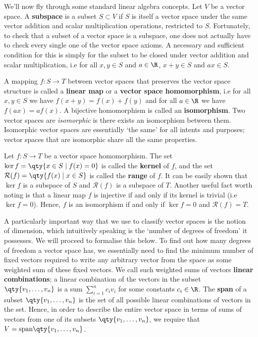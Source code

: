 \vspace{3mm}

We'll now fly through some standard linear algebra concepts. Let \( V \) be a vector space. A \textbf{subspace} is a subset \( S\subset V \) if \( S \) is itself a vector space under the same vector addition and scalar multiplication operations, restricted to \( S \). Fortunately, to check that a subset of a vector space is a subspace, one does not actually have to check every single one of the vector space axioms. A necessary and sufficient condition for this is simply for the subset to be closed under vector addition and scalar multiplication, i.e for all \( x,y\in S \) and \( a\in\R \), \( x+y\in S \) and \( ax\in S \).

\vspace{3mm}

A mapping \( f:S\to T \) between vector spaces that preserves the vector space structure is called a \textbf{linear map} or a \textbf{vector space homomorphism}, i.e for all \( x,y\in S \) we have \( f(x+y)=f(x)+f(y) \) and for all \( a\in\R \) we have \( f(ax)=af(x) \). A bijective homomorphism is called an \textbf{isomorphism}. Two vector spaces are \emph{isomorphic} is there exists an isomorphism between them. Isomorphic vector spaces are essentially `the same' for all intents and purposes; vector spaces that are isomorphic share all the same properties.

\vspace{3mm}

Let \( f:S\to T \) be a vector space homomorphism. The set \( \ker f=\qty{x\in S\mid f(x)=0} \) is called the \textbf{kernel} of \( f \), and the set \( \mathcal{R}(f)=\qty{f(x)\mid x\in S} \) is called the \textbf{range} of \( f \). It can be easily shown that \( \ker f \) is a subspace of \( S \) and \( \mathcal{R}(f) \) is a subspace of \( T \). Another useful fact worth noting is that a linear map \( f \) is injective if and only if its kernel is trivial (i.e \( \ker f=\qty{0} \)). Hence, \( f \) is an isomorphism if and only if \( \ker f=\qty{0} \) and \( \mathcal{R}(f)=T \).

\vspace{3mm}

A particularly important way that we use to classify vector spaces is the notion of dimension, which intuitively speaking is the `number of degrees of freedom' it possesses. We will proceed to formalise this below. To find out how many degrees of freedom a vector space has, we essentially need to find the minimum number of fixed vectors required to write any arbitrary vector from the space as some weighted sum of these fixed vectors. We call such weighted sums of vectors \textbf{linear combinations}; a linear combination of the vectors in the subset \( \qty{v_1,\dots,v_n} \) is a sum \( \sum_{i=1}^nc_iv_i \) for some constants \( c_i\in\R \). The \textbf{span} of a subset \( \qty{v_1,\dots,v_n} \) is the set of all possible linear combinations of vectors in the set. Hence, in order to describe the entire vector space in terms of sums of vectors from one of its subsets \( \qty{v_1,\dots,v_n} \), we require that \( V=\text{span}\qty{v_1,\dots,v_n} \).

